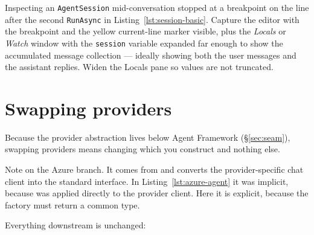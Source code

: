 %
{Inspecting an \texttt{AgentSession} mid-conversation}%
{\vsver{} stopped at a breakpoint on the line after the second
\texttt{RunAsync} in Listing~\ref{lst:session-basic}. Capture the editor with the
breakpoint and the yellow current-line marker visible, plus the \emph{Locals} or
\emph{Watch} window with the \texttt{session} variable expanded far enough to
show the accumulated message collection --- ideally showing both the user
messages and the assistant replies. Widen the Locals pane so values are not
truncated.}

\section{Swapping providers}
\label{sec:swap}

Because the provider abstraction lives below Agent Framework
(\S\ref{sec:seam}), swapping providers means changing which  you
construct and nothing else.


Note  on the Azure branch. It comes from
 and converts the provider-specific chat
client into the standard interface. In Listing~\ref{lst:azure-agent} it was
implicit, because  was applied directly to the provider client.
Here it is explicit, because the factory must return a common type.

Everything downstream is unchanged:

